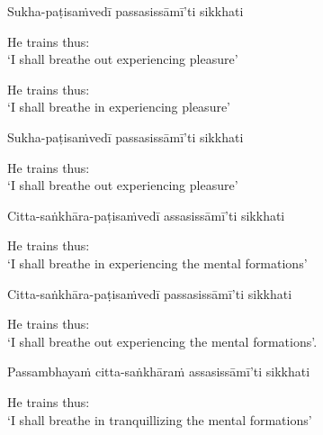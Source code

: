 Sukha-paṭisaṁvedī passasissāmī'ti sikkhati

\begin{cprenglish}
  He trains thus:\\
  `I shall breathe out experiencing pleasure’
\end{cprenglish}


\begin{english}
  He trains thus:\\
  `I shall breathe in experiencing pleasure'
\end{english}

Sukha-paṭisaṁvedī passasissāmī'ti sikkhati

\begin{english}
  He trains thus:\\
  `I shall breathe out experiencing pleasure'
\end{english}

Citta-saṅkhāra-paṭisaṁvedī assasissāmī'ti sikkhati

\begin{english}
  He trains thus:\\
  `I shall breathe in experiencing the mental formations'
\end{english}

Citta-saṅkhāra-paṭisaṁvedī passasissāmī'ti sikkhati

\begin{english}
  He trains thus:\\
  `I shall breathe out experiencing the mental formations'.
\end{english}

Passambhayaṁ citta-saṅkhāraṁ assasissāmī'ti sikkhati

\begin{english}
  He trains thus:\\
  `I shall breathe in tranquillizing the mental formations'
\end{english}

